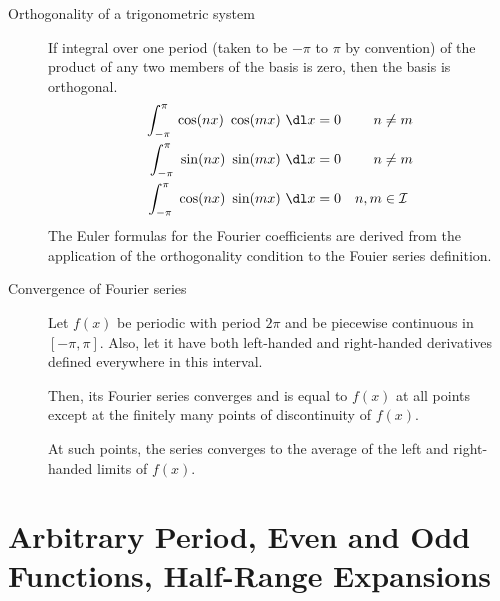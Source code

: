 \begin{description}
    \item[Orthogonality of a trigonometric system] If integral over one period (taken to
        be $ -\pi $ to $ \pi $ by convention) of the product of any two members of the
        basis is zero, then the basis is orthogonal.
        \begin{align}
            \int_{-\pi}^{\pi}\ \cos(nx)\ \cos(mx)\ \dl x & = 0             &
            n                                            & \neq m            \\
            \int_{-\pi}^{\pi}\ \sin(nx)\ \sin(mx)\ \dl x & = 0             &
            n                                            & \neq m            \\
            \int_{-\pi}^{\pi}\ \cos(nx)\ \sin(mx)\ \dl x & = 0             &
            n,m                                          & \in \mathcal{I}
        \end{align}
        The Euler formulas for the Fourier coefficients are derived from the application
        of the orthogonality condition to the Fouier series definition.

    \item[Convergence of Fourier series] Let $ f(x) $ be periodic with period $ 2\pi $
        and be piecewise continuous in $ [-\pi, \pi] $. Also, let it have both
        left-handed and right-handed derivatives defined everywhere in this interval.
        \par Then, its Fourier series converges and is equal to $ f(x) $ at all points
        except at the finitely many points of discontinuity of $ f(x) $. \par
        At such points, the series converges to the average of the left and right-handed
        limits of $ f(x) $.
\end{description}

\section{Arbitrary Period, Even and Odd Functions, Half-Range Expansions}

